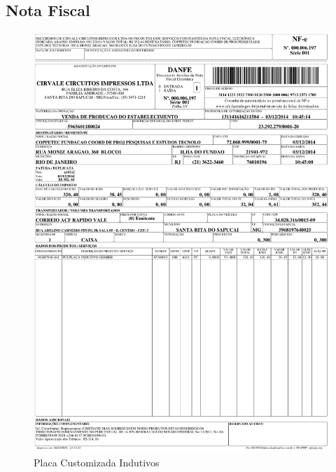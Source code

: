 \subsection{Nota Fiscal}
\begin{figure}[H]
 \centering
 \includegraphics[width=0.9\columnwidth]{Placa/nota_placa.pdf}
 \caption{Placa Customizada Indutivos}
 \end{figure}